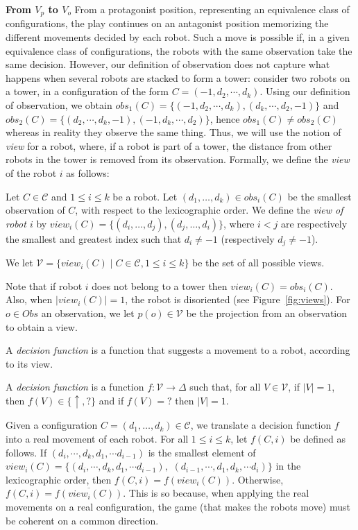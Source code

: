 \documentclass[envcountsame]{llncs} \usepackage[english]{babel}
\newcommand{\view}{\ensuremath{\mathit{view}}}
\newcommand{\Views}{\ensuremath{\mathcal{V}}}
\newcommand{\obs}{\ensuremath{\mathit{obs}}}
\newcommand{\Config}{\ensuremath{\mathcal{C}}}
\newcommand{\still}{\ensuremath{\uparrow}}
\newcommand{\disoriented}{?}
\newcommand{\Actions}{\ensuremath{\Delta}}
\begin{document}
\textbf{From $V_p$ to $V_o$}
From a protagonist position, representing an equivalence class of configurations,
the play continues on an antagonist position memorizing the different movements
decided by each robot. Such a move is possible if, in a given equivalence class
of configurations, the robots with the same observation take the same decision. 
However,
our definition of observation does not capture what happens when several
robots are stacked to form a tower: 
consider two robots on a tower, in a configuration of the form
$C=(-1,d_2,\cdots,d_k)$. Using our definition of observation, we obtain
$\obs_1(C)=\{(-1,d_2,\cdots,d_k),(d_k,\cdots,d_2,-1)\}$ and $\obs_2(C)=\{(d_2,\cdots,d_k,-1),(-1,d_k,\cdots,d_2)\}$,
hence $\obs_1(C)\neq \obs_2(C)$ whereas in reality they observe the same thing.
Thus, we will use the notion of \emph{view} for a robot, where, if a robot is part of a tower, the distance
from other robots in the tower is removed from its observation. Formally, we define the \emph{view} of the robot $i$
as follows:

\begin{definition}[view]
Let $C\in\Config$ and $1\leq i\leq k$ be a robot. Let $(d_1,\dots, d_k)\in\obs_i(C)$ be
the smallest observation of $C$, with respect to the lexicographic order. We define the \emph{view of robot $i$} by
$\view_i(C)=\{(d_i, \dots, d_j), (d_j,\dots, d_i)\}$, where $i<j$ are respectively the smallest and greatest index such that $d_i\neq -1$ 
(respectively $d_j\neq -1$).

We let $\Views = \{\view_i(C)\mid C\in\Config, 1\leq i\leq k\}$
 be the set of all possible views.
\end{definition}

Note that if robot $i$ does not belong to a tower
then $\view_i(C) = \obs_i(C)$. Also, when $|\view_i(C)|=1$,
the robot is disoriented (see Figure~\ref{fig:views}).
For $o\in Obs$ an observation, we let $p(o)\in\Views$ be the projection
from an observation to obtain a view.

A \emph{decision function} is a function that suggests a  
movement to a robot, according to its view. 

\begin{definition} A \emph{decision function} is a function $f:\Views\rightarrow \Actions$ such that, for all $V\in\Views$, if $|V|=1$, then
$f(V)\in\{\still,\disoriented\}$ and if $f(V)=\disoriented$ then $|V|=1$.
\end{definition}

Given a configuration $C=(d_1,\dots,d_k)\in\Config$, we translate a decision function $f$ into a real movement of each robot. For all $1\leq i\leq k$, let $f(C,i)$ be defined as follows. If $(d_i,\cdots, d_k,d_1,\cdots d_{i-1})$ is the smallest element of $\view_i(C)=\{(d_i,\cdots, d_k,d_1,\cdots d_{i-1}),$
$(d_{i-1},\cdots, d_1,d_k,\cdots d_i)\}$ in the
lexicographic order, then $f(C,i)=f(\view_i(C))$. Otherwise, $f(C,i)=\overline{f(\view_i(C))}$.
This is so because, when applying the real movements on a real configuration, the game (that makes
the robots move) must be coherent on a common direction.
\end{document}
